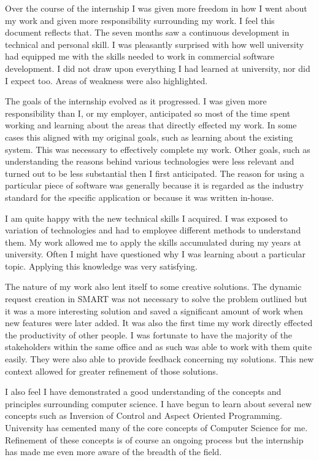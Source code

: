 \documentclass[a4paper, 11pt, titlepage]{article}
\begin{document}
Over the course of the internship I was given more freedom in how I went about my work and given more responsibility surrounding my work. I feel this document reflects that. The seven months saw a continuous development in technical and personal skill. I was pleasantly surprised with how well university had equipped me with the skills needed to work in commercial software development. I did not draw upon everything I had learned at university, nor did I expect too. Areas of weakness were also highlighted. 

The goals of the internship evolved as it progressed. I was given more responsibility than I, or my employer, anticipated so most of the time spent working and learning about the areas that directly effected my work. In some cases this aligned with my original goals, such as learning about the existing system. This was necessary to effectively complete my work. Other goals, such as understanding the reasons behind various technologies were less relevant and turned out to be less substantial then I first anticipated. The reason for using a particular piece of software was generally because it is regarded as the industry standard for the specific application or because it was written in-house.

I am quite happy with the new technical skills I acquired. I was exposed to variation of technologies and had to employee different methods to understand them. My work allowed me to apply the skills accumulated during my years at university. Often I might have questioned why I was learning about a particular topic. Applying this knowledge was very satisfying.

The nature of my work also lent itself to some creative solutions. The dynamic request creation in SMART was not necessary to solve the problem outlined but it was a more interesting solution and saved a significant amount of work when new features were later added. It was also the first time my work directly effected the productivity of other people. I was fortunate to have the majority of the stakeholders within the same office and as such was able to work with them quite easily. They were also able to provide feedback concerning my solutions. This new context allowed for greater refinement of those solutions.

I also feel I have demonstrated a good understanding of the concepts and principles surrounding computer science. I have begun to learn about several new concepts such as Inversion of Control and Aspect Oriented Programming. University has cemented many of the core concepts of Computer Science for me. Refinement of these concepts is of course an ongoing process but the internship has made me even more aware of the breadth of the field.
\end{document}
